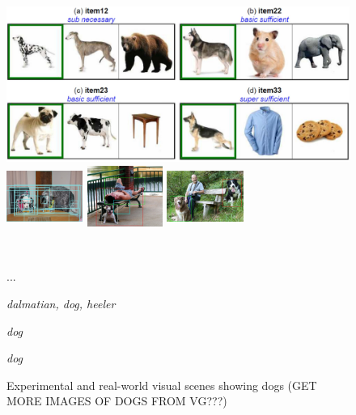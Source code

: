 \documentclass[runningheads]{llncs}
\begin{document}
\begin{figure}[t]
	\begin{center}
		\begin{minipage}{.35\textwidth}
			\includegraphics[scale=.15]{fig/graffig.jpg}
		\end{minipage}
		\begin{minipage}{.2\textwidth}
			\includegraphics[height=2cm,width=2.5cm]{fig/visual_genome_dogs.png}
		\end{minipage}
	\begin{minipage}{.2\textwidth}
		\includegraphics[height=2cm,width=2.5cm]{fig/flickr_1003163366_dog_boxes_crop.jpg}
	\end{minipage}
	\begin{minipage}{.2\textwidth}
		\includegraphics[height=2cm,width=2.5cm]{fig/refcoco_2400_dog_boxes_crop.jpg}
	\end{minipage}\vspace{-.7cm}\\
\begin{minipage}{.35\textwidth}
	...
\end{minipage}
\begin{minipage}{.2\textwidth}
	\tiny
	{\textsl{dalmatian, dog, heeler}}
\end{minipage}
\begin{minipage}{.2\textwidth}
	\textsl{\tiny dog}
\end{minipage}
\begin{minipage}{.2\textwidth}
	\tiny \textsl{dog}
\end{minipage}
	\end{center}
	\caption{Experimental and real-world visual scenes showing dogs (GET MORE IMAGES OF DOGS FROM VG???)}
	\label{fig:graf_genome}
\end{figure}
\end{document}
